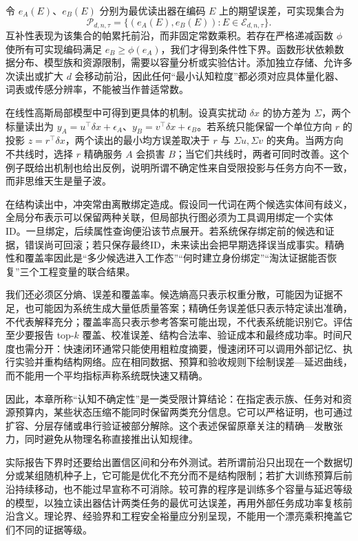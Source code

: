 令 $e_A(E)$、$e_B(E)$ 分别为最优读出器在编码 $E$ 上的期望误差，可实现集合为
\[
\mathcal P_{d,n,\tau}=\{(e_A(E),e_B(E)):E\in\mathcal E_{d,n,\tau}\}.
\]
互补性表现为该集合的帕累托前沿，而非固定常数乘积。若存在严格递减函数 $\phi$ 使所有可实现编码满足 $e_B\ge\phi(e_A)$，我们才得到条件性下界。函数形状依赖数据分布、模型族和资源限制，需要以容量分析或实验估计。添加独立存储、允许多次读出或扩大 $d$ 会移动前沿，因此任何“最小认知粒度”都必须对应具体量化器、词表或传感分辨率，不能被当作普适常数。

在线性高斯局部模型中可得到更具体的机制。设真实扰动 $\delta x$ 的协方差为 $\Sigma$，两个标量读出为 $y_A=u^\top\delta x+\epsilon_A$、$y_B=v^\top\delta x+\epsilon_B$。若系统只能保留一个单位方向 $r$ 的投影 $z=r^\top\delta x$，两个读出的最小均方误差取决于 $r$ 与 $\Sigma u,\Sigma v$ 的夹角。当两方向不共线时，选择 $r$ 精确服务 $A$ 会损害 $B$；当它们共线时，两者可同时改善。这个例子既给出机制也给出反例，说明所谓不确定性来自受限投影与任务方向不一致，而非思维天生是量子波。

在结构读出中，冲突常由离散绑定造成。假设同一代词在两个候选实体间有歧义，全局分布表示可以保留两种关联，但局部执行图必须为工具调用绑定一个实体ID。一旦绑定，后续属性查询便沿该节点展开。若系统保存绑定前的候选和证据，错误尚可回滚；若只保存最终ID，未来读出会把早期选择误当成事实。精确性和覆盖率因此是“多少候选进入工作态”“何时建立身份绑定”“淘汰证据能否恢复”三个工程变量的联合结果。

我们还必须区分熵、误差和覆盖率。候选熵高只表示权重分散，可能因为证据不足，也可能因为系统生成大量低质量答案；精确任务误差低只表示特定读出准确，不代表解释充分；覆盖率高只表示参考答案可能出现，不代表系统能识别它。评估至少要报告 top-$k$ 覆盖、校准误差、结构合法率、验证成本和最终成功率。时间尺度也需分开：快速闭环通常只能使用粗粒度摘要，慢速闭环可以调用外部记忆、执行实验并重构结构网络。应在相同数据、预算和验收规则下绘制误差—延迟曲线，而不能用一个平均指标声称系统既快速又精确。

因此，本章所称“认知不确定性”是一类受限计算结论：在指定表示族、任务对和资源预算内，某些状态压缩不能同时保留两类充分信息。它可以严格证明，也可通过扩容、分层存储或串行验证被部分解除。这个表述保留原章关注的精确—发散张力，同时避免从物理名称直接推出认知规律。

实际报告下界时还要给出置信区间和分布外测试。若所谓前沿只出现在一个数据切分或某组随机种子上，它可能是优化不充分而不是结构限制；若扩大训练预算后前沿持续移动，也不能过早宣称不可消除。较可靠的程序是训练多个容量与延迟等级的模型，以独立读出器估计两类任务的最优可达误差，再用外部任务成功率复核前沿含义。理论界、经验界和工程安全裕量应分别呈现，不能用一个漂亮乘积掩盖它们不同的证据等级。


